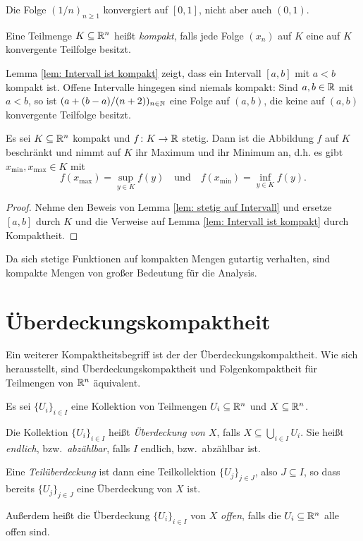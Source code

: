 \documentclass[a4paper,10pt]{article}
\begin{document}
\begin{bsp}
 Die Folge $(1/n)_{n \geq 1}$ konvergiert auf $[0,1]$, nicht aber auch $(0,1)$.
\end{bsp}



\begin{defi}
 Eine Teilmenge $K \subseteq \mathbb{R}^n$ heißt \emph{kompakt}, falls jede Folge $(x_n)$ auf $K$ eine auf $K$ konvergente Teilfolge besitzt.
\end{defi}


\begin{bsp}
 Lemma \ref{lem: Intervall ist kompakt} zeigt, dass ein Intervall $[a,b]$ mit $a < b$ kompakt ist. Offene Intervalle hingegen sind niemals kompakt: Sind $a,b \in \mathbb{R}$ mit $a < b$, so ist $(a + (b-a)/(n+2))_{n \in \mathbb{N}}$ eine Folge auf $(a,b)$, die keine auf $(a,b)$ konvergente Teilfolge besitzt.
\end{bsp}


\begin{prop}
 Es sei $K \subseteq \mathbb{R}^n$ kompakt und $f \colon K \to \mathbb{R}$ stetig. Dann ist die Abbildung $f$ auf $K$ beschränkt und nimmt auf $K$ ihr Maximum und ihr Minimum an, d.h. es gibt $x_{\text{min}}, x_{\text{max}} \in K$ mit
 \[
  f(x_{\text{max}}) = \sup_{y \in K} f(y)
  \quad
  \text{und}
  \quad
  f(x_{\text{min}}) = \inf_{y \in K} f(y).
 \]
\end{prop}
\begin{proof}
 Nehme den Beweis von Lemma \ref{lem: stetig auf Intervall} und ersetze $[a,b]$ durch $K$ und die Verweise auf Lemma \ref{lem: Intervall ist kompakt} durch Kompaktheit.
\end{proof}


Da sich stetige Funktionen auf kompakten Mengen gutartig verhalten, sind kompakte Mengen von großer Bedeutung für die Analysis.





\section{Überdeckungskompaktheit}


Ein weiterer Kompaktheitsbegriff ist der der Überdeckungskompaktheit. Wie sich herausstellt, sind Überdeckungskompaktheit und Folgenkompaktheit für Teilmengen von $\mathbb{R}^n$ äquivalent.


\begin{defi}
 Es sei $\{U_i\}_{i \in I}$ eine Kollektion von Teilmengen $U_i \subseteq \mathbb{R}^n$ und $X \subseteq \mathbb{R}^n$.
 
 Die Kollektion $\{U_i\}_{i \in I}$ heißt \emph{Überdeckung von $X$}, falls $X \subseteq \bigcup_{i \in I} U_i$. Sie heißt \emph{endlich}, bzw.\ \emph{abzählbar}, falls $I$ endlich, bzw.\ abzählbar ist.
 
 Eine \emph{Teilüberdeckung} ist dann eine Teilkollektion $\{U_j\}_{j \in J}$, also $J \subseteq I$, so dass bereits $\{U_j\}_{j \in J}$ eine Überdeckung von $X$ ist.
 
 Außerdem heißt die Überdeckung $\{U_i\}_{i \in I}$ von $X$ \emph{offen}, falls die $U_i \subseteq \mathbb{R}^n$ alle offen sind.
\end{defi}
\end{document}
